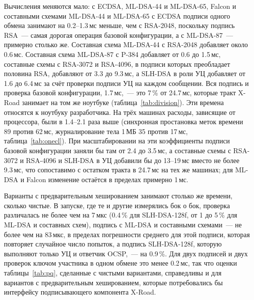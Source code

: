 \documentclass[conference,a4paper]{IEEEtran}
\newcommand{\newtext}[1]{{\color{blue}#1}}
\newcommand{\newgreen}[1]{{\color{green!50!black}#1}}
\newcommand{\newviolet}[1]{{\color{violet}#1}}
\begin{document}
{\newtext{Вычисления меняются мало:} с ECDSA,
ML-DSA-44 и ML-DSA-65, Falcon и составными схемами ML-DSA-44 и ML-DSA-65 с ECDSA
подписи одного обмена занимают на 0.2--1.3\,мс меньше, чем с RSA-2048, поскольку подпись RSA~---
самая дорогая операция базовой конфигурации, а с ML-DSA-87~--- примерно столько же. \newgreen{Составная схема
ML-DSA-44 с RSA-2048 добавляет около 0.6\,мс.} Составная схема
ML-DSA-87 с P-384 добавляет от 0.6 до \newgreen{1.5}\,мс, составные схемы с RSA-3072 и RSA-4096, в подписи которых
преобладает половина RSA, добавляют от 3.3 до 9.3\,мс, а SLH-DSA в роли УЦ добавляет от 1.6 до 6.4\,мс за счёт
проверки подписи УЦ на каждом сообщении. Вся подпись и проверка
базовой конфигурации, 1.7\,мс,~--- это 7\,\% от 24.7\,мс, которые тракт X-Road занимает на том же ноутбуке
(таблица~\ref{tab:division}). \newtext{Эти времена относятся к ноутбуку разработчика. На трёх
машинах расходы, зависящие от процессора, были в 1.4--2.1 раза выше (синхронная простановка меток времени 89
против 62\,мс, журналирование тела 1\,МБ 35 против 17\,мс, таблица~\ref{tab:onecl}). При масштабировании на эти
коэффициенты подписи базовой конфигурации заняли бы там от 2.4 до 3.5\,мс, а составные схемы с
RSA-3072 и RSA-4096 и SLH-DSA в УЦ добавили бы до 13--19\,мс вместо не более 9.3\,мс,
что сопоставимо с остатком тракта в 24.7\,мс на тех же машинах; для ML-DSA и Falcon
изменение остаётся в пределах примерно 1\,мс.}

\newviolet{Варианты с предварительным хешированием занимают столько же времени, сколько чистые. В запуске, где те и другие
измерялись бок о бок, проверка различалась не более чем на 7\,мкс (0.4\,\% для SLH-DSA-128f, от 1 до 5\,\% для
ML-DSA и составных схем), подпись с ML-DSA и составными схемами~--- не более чем на 83\,мкс, в пределах
погрешности среднего для этой подписи, которая повторяет случайное число попыток, а подпись
SLH-DSA-128f, которую выполняют только УЦ и ответчик OCSP,~--- на 0.9\,\%. Для двух
подписей и двух проверок ключом участника в одном обмене это менее 0.2\,мс, так что
оценки таблицы~\ref{tab:pq}, сделанные с чистыми вариантами, справедливы и для вариантов с предварительным хешированием, которые
потребовались бы интерфейсу подписывающего компонента X-Road.}

}
\end{document}
